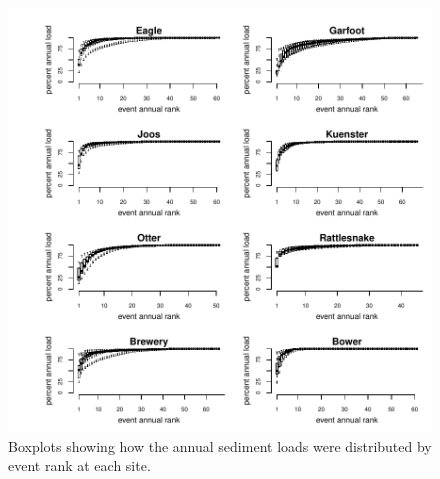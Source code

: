 \documentclass[10pt]{article}
\begin{document}
\begin{figure}[h]
    \begin{center}
\includegraphics{loadings-show-cumulative-sediment-boxplots}
    \caption{Boxplots showing how the annual sediment loads were distributed by event rank at each site.\label{cumulative-sediment-boxplots}}
    \end{center}
\end{figure}
\end{document}
